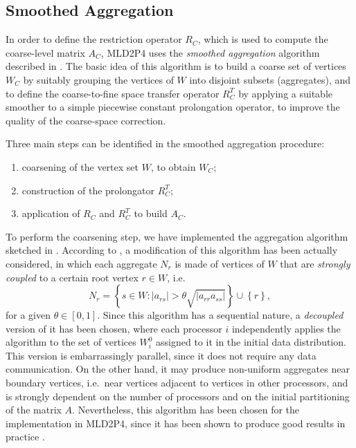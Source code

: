 \subsection{Smoothed Aggregation\label{sec:aggregation}}

In order to define the restriction operator $R_C$, which is used to compute
the coarse-level matrix $A_C$, MLD2P4 uses the \emph{smoothed aggregation}
algorithm described in \cite{BREZINA_VANEK,VANEK_MANDEL_BREZINA}.
The basic idea of this algorithm is to build a coarse set of vertices
$W_C$ by suitably grouping the vertices of $W$ into disjoint subsets
(aggregates), and to define the coarse-to-fine space transfer operator $R_C^T$ by
applying a suitable smoother to a simple piecewise constant
prolongation operator, to improve the quality of the coarse-space correction.

Three main steps can be identified in the smoothed aggregation procedure:
\begin{enumerate}
	\item coarsening of the vertex set $W$, to obtain $W_C$;
	\item construction of the prolongator $R_C^T$;
	\item application of $R_C$ and $R_C^T$ to build $A_C$.
\end{enumerate}
 
To perform the coarsening step, we have implemented the aggregation algorithm sketched
in \cite{apnum_07}. According to \cite{VANEK_MANDEL_BREZINA}, a modification of
this algorithm has been actually considered,
in which each aggregate $N_r$ is made of vertices of $W$ that are \emph{strongly coupled}
to a certain root vertex $r \in W$, i.e.\
\[  N_r = \left\{s \in W: |a_{rs}| > \theta \sqrt{|a_{rr}a_{ss}|} \right\}
    \cup \left\{ r \right\} ,
\]
for a given $\theta \in [0,1]$.
Since this algorithm has a sequential nature, a \emph{decoupled} version of
it has been chosen, where each processor $i$ independently applies the algorithm to
the set of vertices $W_i^0$ assigned to it in the initial data distribution. This
version is embarrassingly parallel, since it does not require any data communication.
On the other hand, it may produce non-uniform aggregates near boundary vertices,
i.e.\ near vertices adjacent to vertices in other processors, and is strongly
dependent on the number of processors and on the initial partitioning of the matrix $A$.
Nevertheless, this algorithm has been chosen for the implementation in MLD2P4,
since it has been shown to produce good results in practice
\cite{aaecc_07,apnum_07,TUMINARO_TONG}.

